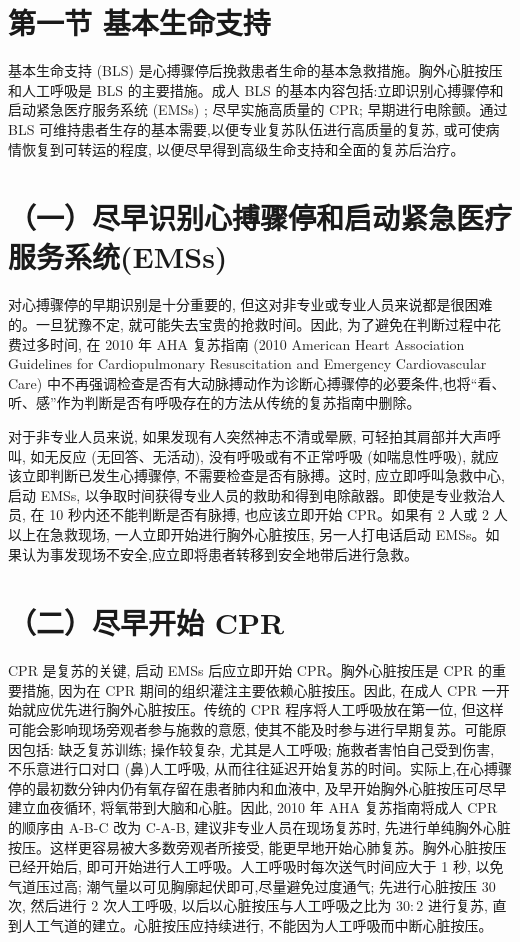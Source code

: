 \documentclass[10pt]{article}
\begin{document}
\section*{第一节 基本生命支持}
基本生命支持 (BLS) 是心搏骤停后挽救患者生命的基本急救措施。胸外心脏按压和人工呼吸是 BLS 的主要措施。成人 BLS 的基本内容包括:立即识别心搏骤停和启动紧急医疗服务系统 (EMSs) ; 尽早实施高质量的 CPR; 早期进行电除颤。通过 BLS 可维持患者生存的基本需要,以便专业复苏队伍进行高质量的复苏, 或可使病情恢复到可转运的程度, 以便尽早得到高级生命支持和全面的复苏后治疗。

\section*{（一）尽早识别心搏骤停和启动紧急医疗服务系统(EMSs)}
对心搏骤停的早期识别是十分重要的, 但这对非专业或专业人员来说都是很困难的。一旦犹豫不定, 就可能失去宝贵的抢救时间。因此, 为了避免在判断过程中花费过多时间, 在 2010 年 AHA 复苏指南 (2010 American Heart Association Guidelines for Cardiopulmonary Resuscitation and Emergency Cardiovascular Care) 中不再强调检查是否有大动脉搏动作为诊断心搏骤停的必要条件,也将“看、听、感”作为判断是否有呼吸存在的方法从传统的复苏指南中删除。

对于非专业人员来说, 如果发现有人突然神志不清或晕厥, 可轻拍其肩部并大声呼叫, 如无反应 (无回答、无活动), 没有呼吸或有不正常呼吸 (如喘息性呼吸), 就应该立即判断已发生心搏骤停, 不需要检查是否有脉搏。这时, 应立即呼叫急救中心, 启动 EMSs, 以争取时间获得专业人员的救助和得到电除㪣器。即使是专业救治人员, 在 10 秒内还不能判断是否有脉搏, 也应该立即开始 CPR。如果有 2 人或 2 人以上在急救现场, 一人立即开始进行胸外心脏按压, 另一人打电话启动 EMSs。如果认为事发现场不安全,应立即将患者转移到安全地带后进行急救。

\section*{（二）尽早开始 CPR}
CPR 是复苏的关键, 启动 EMSs 后应立即开始 CPR。胸外心脏按压是 CPR 的重要措施, 因为在 CPR 期间的组织灌注主要依赖心脏按压。因此, 在成人 CPR 一开始就应优先进行胸外心脏按压。传统的 CPR 程序将人工呼吸放在第一位, 但这样可能会影响现场旁观者参与施救的意愿, 使其不能及时参与进行早期复苏。可能原因包括: 缺乏复苏训练; 操作较复杂, 尤其是人工呼吸; 施救者害怕自己受到伤害, 不乐意进行口对口 (鼻)人工呼吸, 从而往往延迟开始复苏的时间。实际上,在心搏骤停的最初数分钟内仍有氧存留在患者肺内和血液中, 及早开始胸外心脏按压可尽早建立血夜循环, 将氧带到大脑和心脏。因此, 2010 年 AHA 复苏指南将成人 CPR 的顺序由 A-B-C 改为 C-A-B, 建议非专业人员在现场复苏时, 先进行单纯胸外心脏按压。这样更容易被大多数旁观者所接受, 能更早地开始心肺复苏。胸外心脏按压已经开始后, 即可开始进行人工呼吸。人工呼吸时每次送气时间应大于 1 秒, 以免气道压过高; 潮气量以可见胸廓起伏即可,尽量避免过度通气; 先进行心脏按压 30 次, 然后进行 2 次人工呼吸, 以后以心脏按压与人工呼吸之比为 $30: 2$ 进行复苏, 直到人工气道的建立。心脏按压应持续进行, 不能因为人工呼吸而中断心脏按压。
\end{document}
